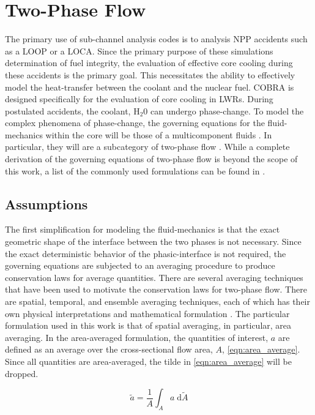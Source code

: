 \section{Two-Phase Flow}
\label{sect:two_phase_flow}
The primary use of sub-channel analysis codes is to analysis NPP accidents such as a LOOP or a LOCA.
Since the primary purpose of these simulations determination of fuel integrity, the evaluation of effective core cooling during these accidents is the primary goal.
This necessitates the ability to effectively model the heat-transfer between the coolant and the nuclear fuel. 
COBRA is designed specifically for the evaluation of core cooling in LWRs.
During postulated accidents, the coolant, H$_2$0 can undergo phase-change.
To model the complex phenomena of phase-change, the governing equations for the fluid-mechanics within the core will be those of a multicomponent fluids \cite{Drew1998}.
In particular, they will are a subcategory of two-phase flow \cite{Todreas2011, Stewart1984}.
While a complete derivation of the governing equations of two-phase flow is beyond the scope of this work, a list of the commonly used formulations can be found in .

\subsection{Assumptions}
\label{subsect:assumptions}

The first simplification for modeling the fluid-mechanics is that the exact geometric shape of the interface between the two phases is not necessary.
Since the exact deterministic behavior of the phasic-interface is not required, the governing equations are subjected to an averaging procedure to produce conservation laws for average quantities.
There are several averaging techniques that have been used to motivate the conservation laws for two-phase flow.
There are spatial, temporal, and ensemble averaging techniques, each of which has their own physical interpretations and mathematical formulation \cite{Drew1998, Todreas2011}.
The particular formulation used in this work is that of spatial averaging, in particular, area averaging.
In the area-averaged formulation, the quantities of interest, $a$ are defined as an average over the cross-sectional flow area, $A$, \eqref{eqn:area_average}.
Since all quantities are area-averaged, the tilde in \eqref{eqn:area_average} will be dropped.

\begin{equation}
\label{eqn:area_average}
\tilde{a} = \frac{1}{A}\int_{A} a \;\mathrm{d}\tilde{A}
\end{equation}

